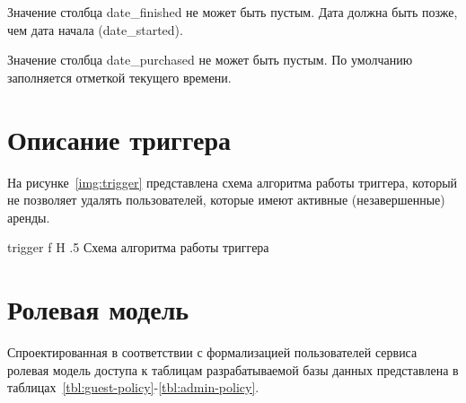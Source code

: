 Значение столбца date\_finished не может быть пустым. Дата должна быть позже, чем дата начала (date\_started).

Значение столбца date\_purchased не может быть пустым. По умолчанию заполняется отметкой текущего времени.

\pagebreak
\section{Описание триггера}

На рисунке~\ref{img:trigger} представлена схема алгоритма работы триггера, который не позволяет удалять пользователей, которые имеют активные (незавершенные) аренды.

{trigger}
{f}
{H}
{.5\textwidth}
{Схема алгоритма работы триггера}

\pagebreak
\section{Ролевая модель}

Спроектированная в соответствии с формализацией пользователей сервиса ролевая модель доступа к таблицам разрабатываемой базы данных представлена в таблицах~\ref{tbl:guest-policy}-\ref{tbl:admin-policy}.

